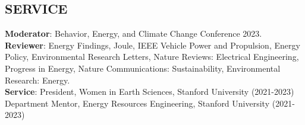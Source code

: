 \documentclass[centered, 11pt]{res}
\begin{document}
\begin{resume}
\section{SERVICE}
\textbf{Moderator}: Behavior, Energy, and Climate Change Conference 2023.\\
\textbf{Reviewer}: Energy Findings, Joule, IEEE Vehicle Power and Propulsion, Energy Policy, Environmental Research Letters, Nature Reviews: Electrical Engineering, Progress in Energy, Nature Communications: Sustainability, Environmental Research: Energy.\\
\textbf{Service}: President, Women in Earth Sciences, Stanford University (2021-2023)\\
Department Mentor, Energy Resources Engineering, Stanford University (2021-2023)

\end{resume}
\end{document}
